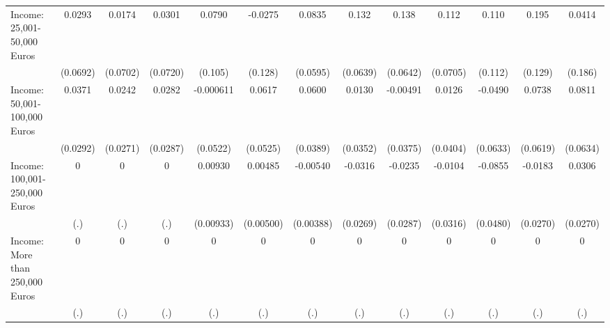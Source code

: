 {\begin{tabular}{l*{12}{c}}
\addlinespace
Income: 25,001-50,000 Euros&      0.0293         &      0.0174         &      0.0301         &      0.0790         &     -0.0275         &      0.0835         &       0.132\sym{*}  &       0.138\sym{*}  &       0.112         &       0.110         &       0.195         &      0.0414         \\
            &    (0.0692)         &    (0.0702)         &    (0.0720)         &     (0.105)         &     (0.128)         &    (0.0595)         &    (0.0639)         &    (0.0642)         &    (0.0705)         &     (0.112)         &     (0.129)         &     (0.186)         \\
\addlinespace
Income: 50,001-100,000 Euros&      0.0371         &      0.0242         &      0.0282         &   -0.000611         &      0.0617         &      0.0600         &      0.0130         &    -0.00491         &      0.0126         &     -0.0490         &      0.0738         &      0.0811         \\
            &    (0.0292)         &    (0.0271)         &    (0.0287)         &    (0.0522)         &    (0.0525)         &    (0.0389)         &    (0.0352)         &    (0.0375)         &    (0.0404)         &    (0.0633)         &    (0.0619)         &    (0.0634)         \\
\addlinespace
Income: 100,001-250,000 Euros&           0         &           0         &           0         &     0.00930         &     0.00485         &    -0.00540         &     -0.0316         &     -0.0235         &     -0.0104         &     -0.0855         &     -0.0183         &      0.0306         \\
            &         (.)         &         (.)         &         (.)         &   (0.00933)         &   (0.00500)         &   (0.00388)         &    (0.0269)         &    (0.0287)         &    (0.0316)         &    (0.0480)         &    (0.0270)         &    (0.0270)         \\
\addlinespace
Income: More than 250,000 Euros&           0         &           0         &           0         &           0         &           0         &           0         &           0         &           0         &           0         &           0         &           0         &           0         \\
            &         (.)         &         (.)         &         (.)         &         (.)         &         (.)         &         (.)         &         (.)         &         (.)         &         (.)         &         (.)         &         (.)         &         (.)         \\
\bottomrule
\end{tabular}
}
